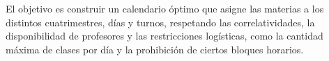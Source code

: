 El objetivo es construir un calendario óptimo que asigne las materias a los distintos cuatrimestres, días y turnos, respetando las correlatividades, la disponibilidad de profesores y las restricciones logísticas, como la cantidad máxima de clases por día y la prohibición de ciertos bloques horarios.